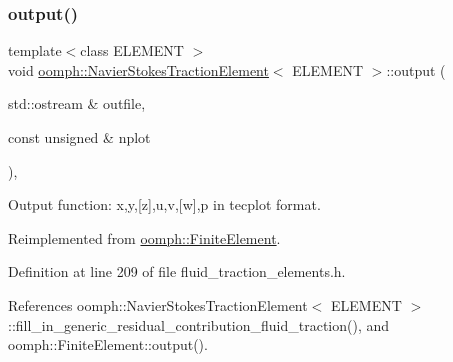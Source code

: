 \subsubsection{\texorpdfstring{output()}{output()}\hspace{0.1cm}{\footnotesize\ttfamily [2/2]}}
{\footnotesize\ttfamily template$<$class E\+L\+E\+M\+E\+NT $>$ \\
void \hyperlink{classoomph_1_1NavierStokesTractionElement}{oomph\+::\+Navier\+Stokes\+Traction\+Element}$<$ E\+L\+E\+M\+E\+NT $>$\+::output (\begin{DoxyParamCaption}\item[{std\+::ostream \&}]{outfile,  }\item[{const unsigned \&}]{nplot }\end{DoxyParamCaption})\hspace{0.3cm}{\ttfamily [inline]}, {\ttfamily [virtual]}}



Output function\+: x,y,\mbox{[}z\mbox{]},u,v,\mbox{[}w\mbox{]},p in tecplot format. 



Reimplemented from \hyperlink{classoomph_1_1FiniteElement_afa9d9b2670f999b43e6679c9dd28c457}{oomph\+::\+Finite\+Element}.



Definition at line 209 of file fluid\+\_\+traction\+\_\+elements.\+h.



References oomph\+::\+Navier\+Stokes\+Traction\+Element$<$ E\+L\+E\+M\+E\+N\+T $>$\+::fill\+\_\+in\+\_\+generic\+\_\+residual\+\_\+contribution\+\_\+fluid\+\_\+traction(), and oomph\+::\+Finite\+Element\+::output().

\mbox{\label{classoomph_1_1NavierStokesTractionElement_a55f3d90286a5fd98dfdae7ac8a5b1b0f}} 
